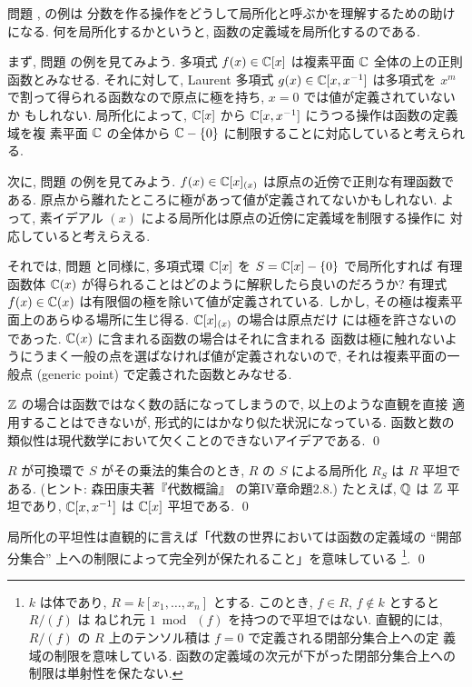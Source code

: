 \documentclass[12pt,twoside]{jarticle}
\begin{document}
\begin{guide}
  問題 ,  の例は
  分数を作る操作をどうして局所化と呼ぶかを理解するための助けになる.
  何を局所化するかというと, 函数の定義域を局所化するのである.
  
  まず, 問題  の例を見てみよう. 
  多項式 $f(x)\in{\mathbb C}[x]$ は複素平面 ${\mathbb C}$ 全体の上の正則函数とみなせる.  
  それに対して, Laurent 多項式 $g(x)\in{\mathbb C}[x,x^{-1}]$ は多項式を $x^m$ 
  で割って得られる函数なので原点に極を持ち, $x=0$ では値が定義されていないか
  もしれない.
  局所化によって, ${\mathbb C}[x]$ から ${\mathbb C}[x,x^{-1}]$ にうつる操作は函数の定義域を複
  素平面 ${\mathbb C}$ の全体から ${\mathbb C}-\{0\}$ に制限することに対応していると考えられる.

  次に, 問題  の例を見てみよう. 
  $f(x)\in{\mathbb C}[x]_{(x)}$ は原点の近傍で正則な有理函数である.
  原点から離れたところに極があって値が定義されてないかもしれない.
  よって, 素イデアル $(x)$ による局所化は原点の近傍に定義域を制限する操作に
  対応していると考えらえる. 

  それでは, 問題  と同様に,
  多項式環 ${\mathbb C}[x]$ を $S = {\mathbb C}[x] - \{0\}$ で局所化すれば
  有理函数体 ${\mathbb C}(x)$ が得られることはどのように解釈したら良いのだろうか? 
  有理式 $f(x)\in{\mathbb C}(x)$ は有限個の極を除いて値が定義されている. しかし,
  その極は複素平面上のあらゆる場所に生じ得る. ${\mathbb C}[x]_{(x)}$ の場合は原点だけ
  には極を許さないのであった.  ${\mathbb C}(x)$ に含まれる函数の場合はそれに含まれる
  函数は極に触れないようにうまく一般の点を選ばなければ値が定義されないので, 
  それは複素平面の一般点 (generic point) で定義された函数とみなせる.

  ${\mathbb Z}$ の場合は函数ではなく数の話になってしまうので, 以上のような直観を直接
  適用することはできないが, 形式的にはかなり似た状況になっている. 
  函数と数の類似性は現代数学において欠くことのできないアイデアである. \qed
\end{guide}

\begin{question}
  $R$ が可換環で $S$ がその乗法的集合のとき, 
  $R$ の $S$ による局所化 $R_S$ は $R$ 平坦である. 
  (ヒント: 森田康夫著『代数概論』 \cite{morita} の第IV章命題2.8.) 
  たとえば, ${\mathbb Q}$ は ${\mathbb Z}$ 平坦であり, 
  ${\mathbb C}[x,x^{-1}]$ は ${\mathbb C}[x]$ 平坦である.  \qed
\end{question}

\begin{guide}
  局所化の平坦性は直観的に言えば「代数の世界においては函数の定義域の ``開部
  分集合'' 上への制限によって完全列が保たれること」を意味している%
  \footnote{$k$ は体であり, $R=k[x_1,\ldots,x_n]$ とする. 
    このとき, $f\in R$, $f\not\in k$ とすると $R/(f)$ は
    ねじれ元 $1\bmod~(f)$ を持つので平坦ではない. 直観的には, 
    $R/(f)$ の $R$ 上のテンソル積は $f=0$ で定義される閉部分集合上への定
    義域の制限を意味している.  函数の定義域の次元が下がった閉部分集合上への
    制限は単射性を保たない.}.  \qed
\end{guide}
\end{document}
